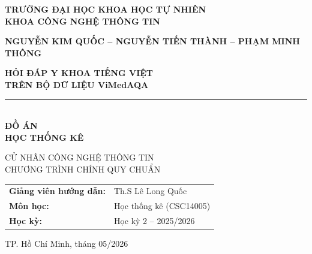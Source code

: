 \hypersetup{pageanchor=false}
\begin{titlepage}
  \thispagestyle{empty}

  \centering
  \vspace*{0.8cm}

  {\large\textbf{TRƯỜNG ĐẠI HỌC KHOA HỌC TỰ NHIÊN}}\\[0.35em]
  {\large\textbf{KHOA CÔNG NGHỆ THÔNG TIN}}

  \vspace{1.2cm}
  {\large\bfseries NGUYỄN KIM QUỐC -- NGUYỄN TIẾN THÀNH -- PHẠM MINH THÔNG}

  \vspace{1.6cm}
  {\Huge\bfseries\color{hcmusblue} HỎI ĐÁP Y KHOA TIẾNG VIỆT}\\[0.5em]
  {\LARGE\bfseries\color{myblue} TRÊN BỘ DỮ LIỆU ViMedAQA}\\[1.2em]
  \rule{12cm}{1.3pt}\\[1.2em]
  {\Large\bfseries ĐỒ ÁN}\\[0.35em]
  {\large\bfseries HỌC THỐNG KÊ}

  \vspace{1cm}
  {\large CỬ NHÂN CÔNG NGHỆ THÔNG TIN}\\[0.35em]
  {\large CHƯƠNG TRÌNH CHÍNH QUY CHUẨN}

  \vfill

  \begin{tabular}{ll}
    \textbf{Giảng viên hướng dẫn:} & Th.S Lê Long Quốc \\[0.35em]
    \textbf{Môn học:}              & Học thống kê (CSC14005) \\[0.35em]
    \textbf{Học kỳ:}               & Học kỳ 2 -- 2025/2026 \\
  \end{tabular}

  \vspace{1cm}
  {\small TP. Hồ Chí Minh, tháng 05/2026}
\end{titlepage}
\clearpage

